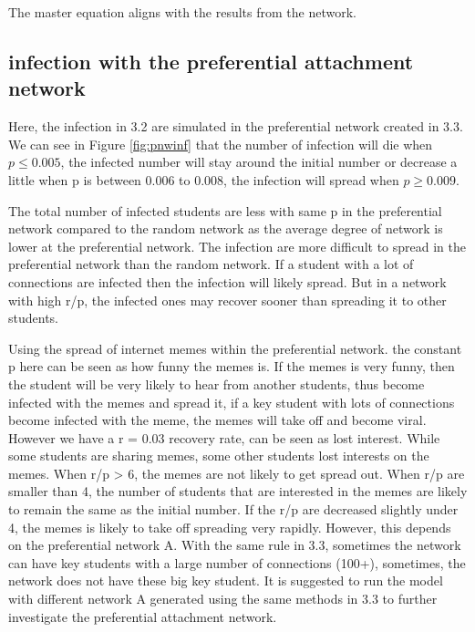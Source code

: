 \documentclass[12pt]{article}
\begin{document}
The master equation aligns with the results from the network. 



\newpage
\subsection{infection with the preferential attachment network}

Here, the infection in 3.2 are simulated in the preferential network created in 3.3. We can see in Figure \ref{fig:pnwinf} that the number of infection will die when $p \leq 0.005$, the infected number will stay around the initial number or decrease a little when p is between 0.006 to 0.008, the infection will spread when $p \geq 0.009$. \par

The total number of infected students are less with same p in the preferential network compared to the random network as the average degree of network is lower at the preferential network. The infection are more difficult to spread in the preferential network than the random network. If a student with a lot of connections are infected then the infection will likely spread. But in a network with high r/p, the infected ones may recover sooner than spreading it to other students. \par

Using the spread of internet memes within the preferential network. the constant p here can be seen as how funny the memes is. If the memes is very funny, then the student will be very likely to hear from another students, thus become infected with the memes and spread it, if a key student with lots of connections become infected with the meme, the memes will take off and become viral. However we have a r = 0.03 recovery rate, can be seen as lost interest. While some students are sharing memes, some other students lost interests on the memes. When r/p > 6, the memes are not likely to get spread out. When r/p are smaller than 4, the number of students that are interested in the memes are likely to remain the same as the initial number. If the r/p are decreased slightly under 4, the memes is likely to take off spreading very rapidly. However, this depends on the preferential network A. With the same rule in 3.3, sometimes the network can have key students with a large number of connections (100+), sometimes, the network does not have these big key student. It is suggested to run the model with different network A generated using the same methods in 3.3 to further investigate the preferential attachment network.  
\end{document}
